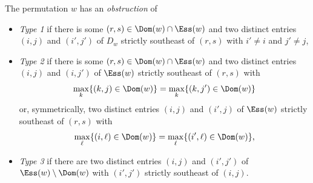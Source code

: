 \begin{definition}
The permutation $w$ has an \emph{obstruction} of \begin{itemize}
\item \emph{Type 1} if there is some $(r,s) \in \Dom(w) \cap \Ess(w)$ and two distinct entries $(i,j)$ and $(i',j')$ of $D_w$ strictly southeast of $(r,s)$ with $i' \neq i$ and $j' \neq j$,
\item \emph{Type 2} if there is some $(r,s) \in \Dom(w) \cap \Ess(w)$ and two distinct entries $(i,j)$ and $(i,j')$ of $\Ess(w)$ strictly southeast of $(r,s)$ with \[
\max_k \{(k,j) \in \Dom(w)\} = \max_k \{(k,j') \in \Dom(w)\}
\] or, symmetrically, two distinct entries $(i,j)$ and $(i',j)$ of $\Ess(w)$ strictly southeast of $(r,s)$ with \[
\max_\ell \{(i,\ell) \in \Dom(w)\} = \max_\ell \{(i',\ell) \in \Dom(w)\},
\]
\item \emph{Type 3} if there are two distinct entries $(i,j)$ and $(i',j')$ of $\Ess(w) \setminus \Dom(w)$ with $(i',j')$ strictly southeast of $(i,j)$.\qedhere
\end{itemize}
\end{definition}

